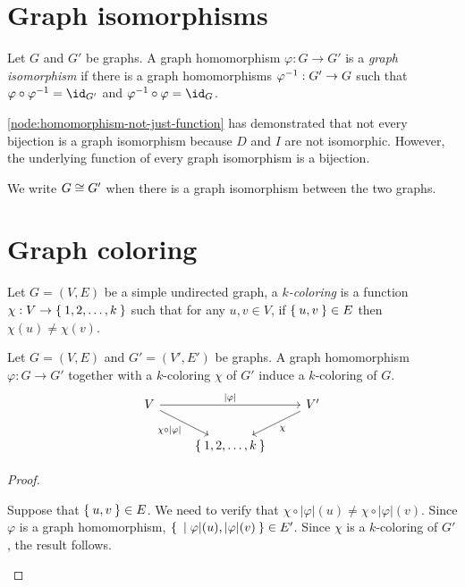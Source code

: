 \documentclass{zett}
\begin{document}
\section{Graph isomorphisms}
\label{sec:graph-isomorphisms}

\begin{defn}
  Let $G$ and $G'$ be graphs.
  A graph homomorphism $\varphi : G \to G'$ is a \emph{graph isomorphism} if there is a graph homomorphisms $\varphi^{-1} : G' \to G$ such that $\varphi \circ \varphi\inv = \id_{G'}$ and $\varphi\inv \circ \varphi = \id_{G}$.
\end{defn}

\begin{node}
  \cref{node:homomorphism-not-just-function} has demonstrated that not every bijection is a graph isomorphism because $D$ and $I$ are not isomorphic.
  However, the underlying function of every graph isomorphism is a bijection.
\end{node}

\begin{notn}
  We write $G \cong G'$ when there is a graph isomorphism between the two graphs.
\end{notn}

\section{Graph coloring}
\label{sec:graph-coloring}

\begin{defn}
  Let $G = (V, E)$ be a simple undirected graph, a \emph{$k$-coloring} is a function $\chi : V \to \Set{1,2,\ldots,k}$ such that for any $u,v \in V$, if $\Set{u,v} \in E$ then $\chi(u) \neq \chi(v)$.
\end{defn}

\begin{lem}
  \label{lem:graph-coloring-induced-coloring}
  Let $G = (V,E)$ and $G' = (V',E')$ be graphs.
  A graph homomorphism $\varphi : G \to G'$ together with a $k$-coloring $\chi$ of $G'$ induce a $k$-coloring of $G$.
  \[
    \begin{tikzcd}
      V && {V'} \\
      & {\Set{1,2,\ldots,k}}
      \arrow["{|\varphi|}", from=1-1, to=1-3]
      \arrow["\chi", from=1-3, to=2-2]
      \arrow["{\chi \circ |\varphi|}"', from=1-1, to=2-2]
    \end{tikzcd}
  \]
\end{lem}
\begin{proof}
  \begin{node}
    Suppose that $\Set{u,v} \in E$.
    We need to verify that $\chi \circ |\varphi|(u) \neq \chi \circ |\varphi|(v)$.
    Since $\varphi$ is a graph homomorphism, $\Set{|\varphi|(u),|\varphi|(v)} \in E'$.
    Since $\chi$ is a $k$-coloring of $G'$, the result follows.
  \end{node}
\end{proof}
\end{document}
